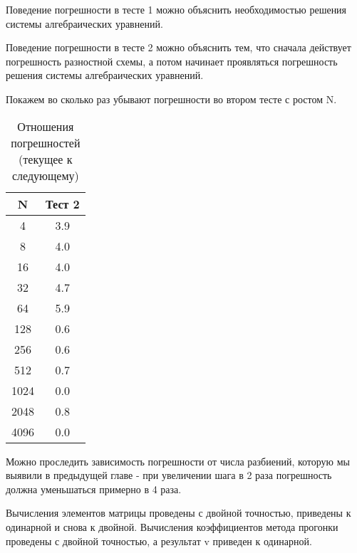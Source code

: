 Поведение погрешности в тесте 1 можно объяснить необходимостью решения системы алгебраических уравнений.

Поведение погрешности в тесте 2 можно объяснить тем, что сначала действует погрешность разностной схемы, а потом начинает проявляться погрешность решения системы алгебраических уравнений.

Покажем во сколько раз убывают погрешности во втором тесте с ростом N.

  \begin{table}[H]
    \centering
    \begin{tabular}{c | c}
      \toprule
      N & Тест 2 \\
      \midrule
4 & 3.9 \\
8 & 4.0 \\
16 & 4.0 \\
32 & 4.7 \\
64 & 5.9 \\
128 & 0.6 \\
256 & 0.6 \\
512 & 0.7 \\
1024 & 0.0 \\
2048 & 0.8 \\
4096 & 0.0 \\

      \bottomrule
    \end{tabular}
    \caption{Отношения погрешностей (текущее к следующему)}
  \end{table}

Можно проследить зависимость погрешности от числа разбиений, которую мы выявили в предыдущей главе - при увеличении шага в 2 раза погрешность должна уменьшаться примерно в 4 раза.

Вычисления элементов матрицы проведены с двойной точностью, приведены к одинарной и снова к двойной. Вычисления коэффициентов метода прогонки проведены с двойной точностью, а результат v приведен к одинарной.
